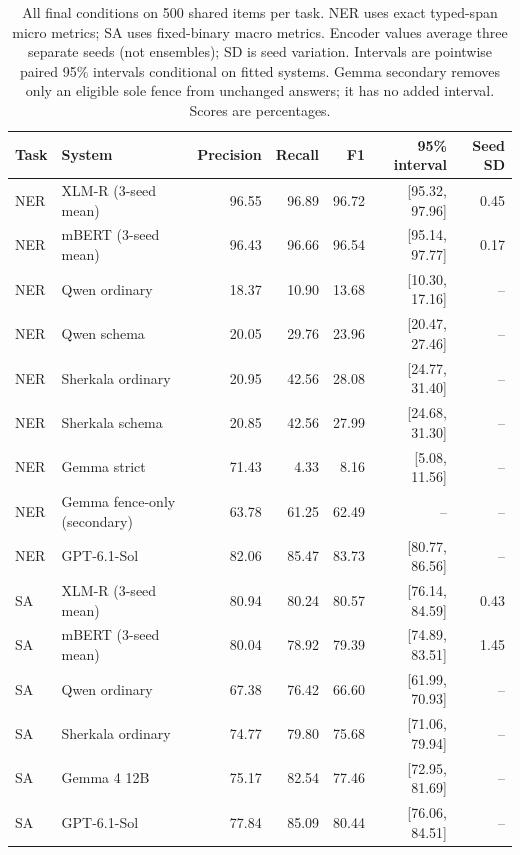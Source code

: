 \begin{table}[t]
\centering\footnotesize
\caption{All final conditions on 500 shared items per task. NER uses exact typed-span micro metrics; SA uses fixed-binary macro metrics. Encoder values average three separate seeds (not ensembles); SD is seed variation. Intervals are pointwise paired 95\% intervals conditional on fitted systems. Gemma secondary removes only an eligible sole fence from unchanged answers; it has no added interval. Scores are percentages.}
\label{tab:conference-main}
\begin{tabular}{llrrrrr}
\toprule
Task & System & Precision & Recall & F1 & 95\% interval & Seed SD\\
\midrule
NER & XLM-R (3-seed mean) & 96.55 & 96.89 & 96.72 & [95.32, 97.96] & 0.45\\
NER & mBERT (3-seed mean) & 96.43 & 96.66 & 96.54 & [95.14, 97.77] & 0.17\\
NER & Qwen ordinary & 18.37 & 10.90 & 13.68 & [10.30, 17.16] & --\\
NER & Qwen schema & 20.05 & 29.76 & 23.96 & [20.47, 27.46] & --\\
NER & Sherkala ordinary & 20.95 & 42.56 & 28.08 & [24.77, 31.40] & --\\
NER & Sherkala schema & 20.85 & 42.56 & 27.99 & [24.68, 31.30] & --\\
NER & Gemma strict & 71.43 & 4.33 & 8.16 & [5.08, 11.56] & --\\
NER & Gemma fence-only (secondary) & 63.78 & 61.25 & 62.49 & -- & --\\
NER & GPT-6.1-Sol & 82.06 & 85.47 & 83.73 & [80.77, 86.56] & --\\
\midrule
SA & XLM-R (3-seed mean) & 80.94 & 80.24 & 80.57 & [76.14, 84.59] & 0.43\\
SA & mBERT (3-seed mean) & 80.04 & 78.92 & 79.39 & [74.89, 83.51] & 1.45\\
SA & Qwen ordinary & 67.38 & 76.42 & 66.60 & [61.99, 70.93] & --\\
SA & Sherkala ordinary & 74.77 & 79.80 & 75.68 & [71.06, 79.94] & --\\
SA & Gemma 4 12B & 75.17 & 82.54 & 77.46 & [72.95, 81.69] & --\\
SA & GPT-6.1-Sol & 77.84 & 85.09 & 80.44 & [76.06, 84.51] & --\\
\bottomrule
\end{tabular}
\end{table}
